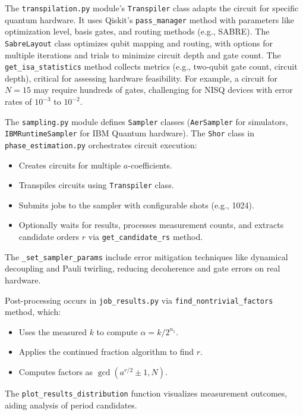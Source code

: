 \documentclass[conference,twoside]{IEEEtran}
\begin{document}
The \texttt{transpilation.py} module’s \texttt{Transpiler} class adapts the circuit for specific quantum hardware. It uses Qiskit’s \texttt{pass\_manager} method with parameters like optimization level, basis gates, and routing methods (e.g., SABRE). The \texttt{SabreLayout} class optimizes qubit mapping and routing, with options for multiple iterations and trials to minimize circuit depth and gate count. The \texttt{get\_isa\_statistics} method collects metrics (e.g., two-qubit gate count, circuit depth), critical for assessing hardware feasibility. For example, a circuit for \( N = 15 \) may require hundreds of gates, challenging for NISQ devices with error rates of \( 10^{-3} \) to \( 10^{-2} \).

The \texttt{sampling.py} module defines \texttt{Sampler} classes (\texttt{AerSampler} for simulators, \texttt{IBMRuntimeSampler} for IBM Quantum hardware). The \texttt{Shor} class in \texttt{phase\_estimation.py} orchestrates circuit execution:
\begin{itemize}
    \item Creates circuits for multiple \( a \)-coefficients.
    \item Transpiles circuits using \texttt{Transpiler} class.
    \item Submits jobs to the sampler with configurable shots (e.g., 1024).
    \item Optionally waits for results, processes measurement counts, and extracts candidate orders \( r \) via \texttt{get\_candidate\_rs} method.
\end{itemize}
The \texttt{\_set\_sampler\_params} include error mitigation techniques like dynamical decoupling and Pauli twirling, reducing decoherence and gate errors on real hardware.

Post-processing occurs in \texttt{job\_results.py} via \texttt{find\_nontrivial\_factors} method, which:
\begin{itemize}
    \item Uses the measured \( k \) to compute \( \alpha = k / 2^{n_1} \).
    \item Applies the continued fraction algorithm to find \( r \).
    \item Computes factors as \( \gcd(a^{r/2} \pm 1, N) \).
\end{itemize}
The \texttt{plot\_results\_distribution} function visualizes measurement outcomes, aiding analysis of period candidates.
\end{document}
